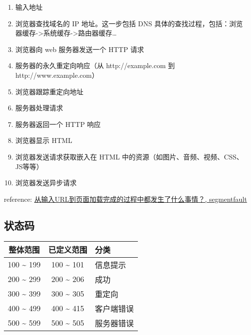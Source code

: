 \begin{enumerate}
\def\labelenumi{\arabic{enumi}.}
\tightlist
\item
  输入地址
\item
  浏览器查找域名的 IP 地址。这一步包括 DNS
  具体的查找过程，包括：浏览器缓存-\textgreater{}系统缓存-\textgreater{}路由器缓存\ldots{}
\item
  浏览器向 web 服务器发送一个 HTTP 请求
\item
  服务器的永久重定向响应（从 http://example.com 到
  http://www.example.com）
\item
  浏览器跟踪重定向地址
\item
  服务器处理请求
\item
  服务器返回一个 HTTP 响应
\item
  浏览器显示 HTML
\item
  浏览器发送请求获取嵌入在 HTML
  中的资源（如图片、音频、视频、CSS、JS等等）
\item
  浏览器发送异步请求
\end{enumerate}

reference:
\href{http://segmentfault.com/q/1010000000489803/a-1020000000489830}{从输入URL到页面加载完成的过程中都发生了什么事情？,
segmentfault}

\subsection{状态码}\label{ux72b6ux6001ux7801}

\begin{longtable}[]{@{}ccl@{}}
\toprule
整体范围 & 已定义范围 & 分类\tabularnewline
\midrule
\endhead
100 \textasciitilde{} 199 & 100 \textasciitilde{} 101 &
信息提示\tabularnewline
200 \textasciitilde{} 299 & 200 \textasciitilde{} 206 &
成功\tabularnewline
300 \textasciitilde{} 399 & 300 \textasciitilde{} 305 &
重定向\tabularnewline
400 \textasciitilde{} 499 & 400 \textasciitilde{} 415 &
客户端错误\tabularnewline
500 \textasciitilde{} 599 & 500 \textasciitilde{} 505 &
服务器错误\tabularnewline
\bottomrule
\end{longtable}

